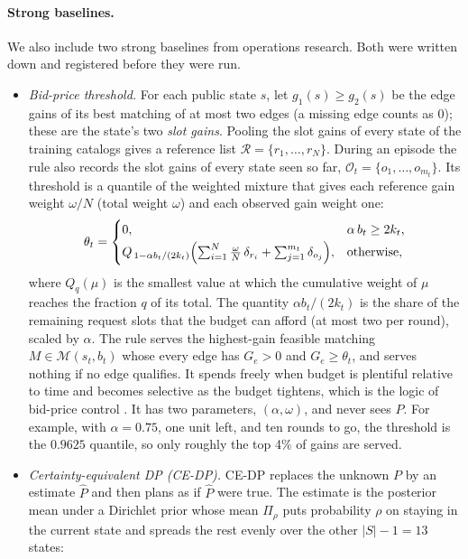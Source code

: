 \documentclass[10pt]{article}
\newcommand{\M}{\mathcal{M}}
\begin{document}
\paragraph{Strong baselines.} We also include two strong baselines from operations research. Both were written down and registered before they were run.
\begin{itemize}[leftmargin=*]
  \item \emph{Bid-price threshold.} For each public state $s$, let $g_1(s)\ge g_2(s)$ be the edge gains of its best matching of at most two edges (a missing edge counts as $0$); these are the state's two \emph{slot gains}. Pooling the slot gains of every state of the training catalogs gives a reference list $\mathcal R=\{r_1,\dots,r_N\}$. During an episode the rule also records the slot gains of every state seen so far, $\mathcal O_t=\{o_1,\dots,o_{m_t}\}$. Its threshold is a quantile of the weighted mixture that gives each reference gain weight $\omega/N$ (total weight $\omega$) and each observed gain weight one:
  \begin{equation}
    \theta_t=\begin{cases}0, & \alpha\,b_t\ge 2k_t,\\[2pt] Q_{\,1-\alpha b_t/(2k_t)}\Bigl(\sum_{i=1}^{N}\tfrac{\omega}{N}\,\delta_{r_i}+\sum_{j=1}^{m_t}\delta_{o_j}\Bigr), & \text{otherwise,}\end{cases}
    \label{eq:bidprice}
  \end{equation}
  where $Q_q(\mu)$ is the smallest value at which the cumulative weight of $\mu$ reaches the fraction $q$ of its total. The quantity $\alpha b_t/(2k_t)$ is the share of the remaining request slots that the budget can afford (at most two per round), scaled by $\alpha$. The rule serves the highest-gain feasible matching $M\in\M(s_t,b_t)$ whose every edge has $G_e>0$ and $G_e\ge\theta_t$, and serves nothing if no edge qualifies. It spends freely when budget is plentiful relative to time and becomes selective as the budget tightens, which is the logic of bid-price control \citep{gallego1994optimal,talluri2004theory}. It has two parameters, $(\alpha,\omega)$, and never sees $P$. For example, with $\alpha=0.75$, one unit left, and ten rounds to go, the threshold is the $0.9625$ quantile, so only roughly the top 4\% of gains are served.
  \item \emph{Certainty-equivalent DP (CE-DP).} CE-DP replaces the unknown $P$ by an estimate $\hat P$ and then plans as if $\hat P$ were true. The estimate is the posterior mean under a Dirichlet prior whose mean $\Pi_\rho$ puts probability $\rho$ on staying in the current state and spreads the rest evenly over the other $|S|-1=13$ states:

\end{itemize}
\end{document}
